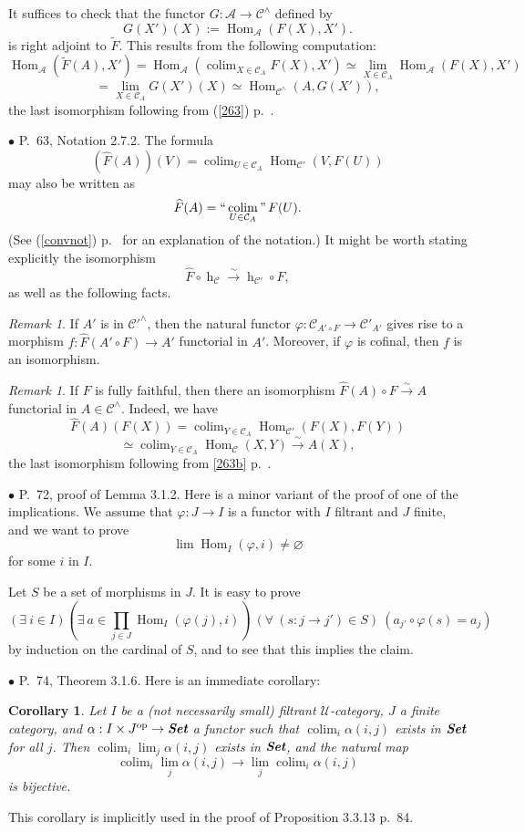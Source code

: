 \documentclass[12pt]{article}
\newtheorem{cor}[thm]{Corollary}
\theoremstyle{remark}%
\newtheorem{rk}[thm]{Remark}
\newcommand{\bu}{\bullet}
\newcommand{\n}{\noindent}
\newcommand{\cc}{\mathcal}
\newcommand{\A}{\mathcal A}
\newcommand{\C}{\mathcal C}
\newcommand{\U}{\mathcal U}
\newcommand{\p}{\varphi}
\newcommand{\xr}{\xrightarrow}
\newcommand{\cn}{(See (\ref{convnot}) p.~\pageref{convnot} for an explanation of the notation.) }
\DeclareMathOperator*{\coli}{colim}
\DeclareMathOperator*{\icolim}{``\coli"}
\DeclareMathOperator{\hy}{h}
\DeclareMathOperator{\Hom}{Hom}
\DeclareMathOperator{\h}{Hom}
\DeclareMathOperator{\op}{op}
\begin{document}
It suffices to check that the functor $G:\A\to\C^\wedge$ defined by 
$$
G(X')(X):=\Hom_{\A}(F(X),X').
$$ 
is right adjoint to $\widetilde F$. This results from the following computation: 
$$
\Hom_{\A}\left(\widetilde F(A),X'\right)=
\Hom_{\A}\left(\coli_{X\in\C_A}F(X),X'\right)\simeq 
\lim_{X\in\C_A}\Hom_{\A}(F(X),X')
$$
$$
=\lim_{X\in\C_A}G(X')(X)\simeq\Hom_{\C^\wedge}(A,G(X')), 
$$ 
the last isomorphism following from (\ref{263}) p.~\pageref{263}. 


\n$\bu$ P.~63, Notation 2.7.2. The formula 
$$
(\widehat F(A))(V)=\coli_{U\in\C_A}\Hom_{\C'}(V,F(U))
$$
may also be written as 
$$
\widehat F(A)=\icolim_{U\in\C_A}F(U).
$$
\cn It might be worth stating explicitly the isomorphism 
$$
\widehat F\circ\hy_\C\xr\sim\hy_{\C'}\circ F,
$$
as well as the following facts. 

\begin{rk}\label{cof}
If $A'$ is in $\cc C'^\wedge$, then the natural functor $\p:\cc C_{A'\circ F}\to\cc C'_{A'}$ gives rise to a morphism $f:\widehat F(A'\circ F)\to A'$ functorial in $A'$. Moreover, if $\p$ is cofinal, then $f$ is an isomorphism. 
\end{rk} 

\begin{rk}
If $F$ is fully faithful, then there an isomorphism $\widehat F(A)\circ F\xr\sim A$ functorial in $A\in\C^\wedge$. Indeed, we have 
$$
\widehat F(A)(F(X))=\coli_{Y\in\C_A}\Hom_{\C'}(F(X),F(Y))
$$
$$
\simeq\coli_{Y\in\C_A}\Hom_\C(X,Y)\xr\sim A(X),
$$
the last isomorphism following from \eqref{263b} p.~\pageref{263b}. 
\end{rk} 


\n$\bu$ P.~72, proof of Lemma 3.1.2. Here is a minor variant of the proof of one of the implications. We assume that $\p:J\to I$ is a functor with $I$ filtrant and $J$ finite, and we want to prove 
$$
\lim\h_I(\p,i)\neq\varnothing
$$ 
for some $i$ in $I$. 

Let $S$ be a set of morphisms in $J$. It is easy to prove 
$$
(\exists\ i\in I)\left(\exists\ a\in\prod_{j\in J}\h_I(\p(j),i)\right)\ (\forall\ (s:j\to j')\in S)\ (a_{j'}\circ\p(s)=a_j) 
$$ 
by induction on the cardinal of $S$, and to see that this implies the claim. 


\n$\bu$ P.~74, Theorem 3.1.6. Here is an immediate corollary: 
%
\begin{cor}\label{316}
Let $I$ be a (not necessarily small) filtrant $\U$-category, $J$ a finite category, and $\alpha:I\times J^{\op}\to\textbf{\em Set}$ a functor such that $\coli_i\alpha(i,j)$ exists in $\textbf{\em Set}$ for all $j$. Then $\coli_i\lim_j\alpha(i,j)$ exists in $\textbf{\em Set}$, and the natural map 
$$
\coli_i\lim_j\alpha(i,j)\to
\lim_j\coli_i\alpha(i,j)
$$ 
is bijective. 
\end{cor}
%
This corollary is implicitly used in the proof of Proposition 3.3.13 p.~84. 
\end{document}
